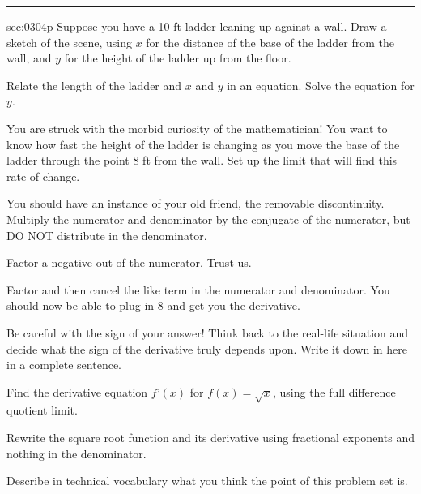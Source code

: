 \renewcommand{\columnseprule}{1.5pt}
\begin{multicols*}{2}
\rule[0.5\baselineskip]{0.4\textwidth}{1pt}
\noindent
{}\label{sec:0304p}
\begin{exercises}{sec:0304p}
\lab{} Suppose you have a 10 ft ladder leaning up against a wall.  Draw a sketch of the scene, using $x$ for the distance of the base of the ladder from the wall, and $y$ for the height of the ladder up from the floor.


\vspace{3cm}
\lab{} Relate the length of the ladder and $x$ and $y$ in an equation.  Solve the equation for $y$.


\vspace{3cm}
\lab{} You are struck with the morbid curiosity of the mathematician!  You want to know how fast the height of the ladder is changing as you move the base of the ladder through the point 8 ft from the wall.  Set up the limit that will find this rate of change.


\vspace{2cm}
\lab{} You should have an instance of your old friend, the removable discontinuity.  Multiply the numerator and denominator by the conjugate of the numerator, but DO NOT distribute in the denominator.


\vspace{3cm}
\lab{} Factor a negative out of the numerator.  Trust us.

\vspace{2cm}
\lab{} Factor and then cancel the like term in the numerator and denominator.  You should now be able to plug in 8 and get you the derivative.  


\vspace{2cm}
\lab{} Be careful with the sign of your answer!  Think back to the real-life situation and decide what the sign of the derivative truly depends upon.  Write it down in here in a complete sentence.


\vspace{2cm}
\lab{} Find the derivative equation $f’(x)$ for $f(x)=\sqrt{x}$, using the full difference quotient limit.



\vspace{5cm}
\lab{} Rewrite the square root function and its derivative using fractional exponents and nothing in the denominator.


\vspace{3cm}
\lab{} Describe in technical vocabulary what you think the point of this problem set is.

\end{exercises}
\end{multicols*}
